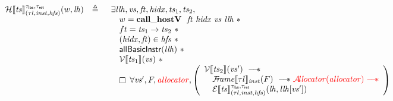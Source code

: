 \documentclass{standalone}
\begin{document}
\[
  \begin{array}{rcl}
    \Hvalid \llbracket \V{ts} \rrbracket_{(\tau l, \V{inst}, \V{hfs})}^{\tau_{\K{lbs}}, \tau_{\K{ret}}}(w,\V{lh}) & \triangleq &
         \begin{array}[t]{l}
           \exists \V{llh}, \V{vs}, \V{ft}, \V{hidx}, \V{ts}_1, \V{ts}_2,\\
           \quad w = \xxWcallhostV~~\V{ft}~\V{hidx}~\V{vs}~\V{llh} ~\ast \\
           \quad ft = \V{ts}_1 \rightarrow \V{ts}_2 ~\ast \\
           \quad (\V{hidx},\V{ft}) \in \V{hfs} ~\ast \\
           \quad \K{allBasicInstr}(\V{llh}) ~\ast \\
           \quad \Vvalid \llbracket \V{ts}_1 \rrbracket(\V{vs}) ~\ast \\
           \quad \always~\forall \V{vs}', F, \rr{\V{allocator}}, \left(\begin{array}{l}
                                                     \Vvalid \llbracket \V{ts}_2 \rrbracket(\V{vs}') ~\wand \\
                                                     \quad \FRvalid \llbracket \tau l \rrbracket_{\V{inst}}(F) ~\wand \rr{\Avalid(\V{allocator})\wand}\\
                                                     \quad \Evalid \llbracket \V{ts} \rrbracket_{(\tau l, \V{inst}, \V{hfs})}^{\tau_{\K{lbs}}, \tau_{\K{ret}}}(\V{lh},\V{llh}[\V{vs}'])
                                                   \end{array}\right)
         \end{array}
  \end{array}
\]
\end{document}

